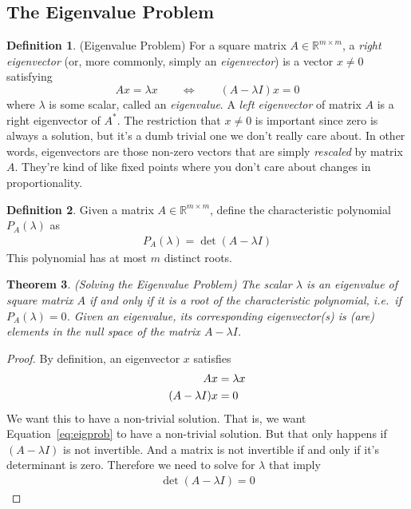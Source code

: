 \documentclass[12pt]{article}
\numberwithin{equation}{section} %
\theoremstyle{plain}
\newtheorem{thm}{Theorem}[section]
\theoremstyle{definition}
\newtheorem{defn}[thm]{Definition}
\theoremstyle{remark}
\newcommand{\Rmm}{\mathbb{R}^{m\times m}}
\begin{document}
\clearpage
\subsection{The Eigenvalue Problem}


\begin{defn}{(Eigenvalue Problem)}
For a square matrix $A \in \Rmm$, a \emph{right eigenvector}
(or, more commonly, simply an \emph{eigenvector}) is a vector $x\neq 0$
satisfying
\begin{equation}
  Ax = \lambda x
  \qquad \Leftrightarrow \qquad
  (A-\lambda I) x = 0
\end{equation}
where $\lambda$ is some scalar, called an \emph{eigenvalue}.  A
\emph{left eigenvector} of matrix $A$ is a right eigenvector of $A^*$.
The restriction that $x\neq 0$ is important since zero is always a
solution, but it's a dumb trivial one we don't really care about.  In
other words, eigenvectors are those non-zero vectors that are simply
\emph{rescaled} by matrix $A$. They're kind of like fixed points where
you don't care about changes in proportionality.
\end{defn}

\begin{defn}
Given a matrix $A\in \Rmm$, define the characteristic
polynomial $P_A(\lambda)$ as
\begin{align}
  \label{chareqn}
  P_A(\lambda) = \det(A-\lambda I)
\end{align}
This polynomial has at most $m$ distinct roots.
\end{defn}

\begin{thm}\emph{(Solving the Eigenvalue Problem)}
The scalar $\lambda$ is an eigenvalue of square matrix $A$ if and only
if it is a root of the characteristic polynomial, i.e.\ if
$P_A(\lambda)=0$.  Given an eigenvalue, its corresponding eigenvector(s)
is (are) elements in the null space of the matrix $A-\lambda I$.
\end{thm}
\begin{proof}
By definition, an eigenvector $x$ satisfies
\begin{align}
  A x &= \lambda x\notag\\
  (A- \lambda I)x &= 0
  \label{eq:eigprob}
\end{align}
We want this to have a non-trivial solution. That is, we want
Equation~\ref{eq:eigprob} to have a non-trivial solution. But that only
happens if $(A-\lambda I)$ is not invertible. And a matrix is not
invertible if and only if it's determinant is zero. Therefore we need to
solve for $\lambda$ that imply
\begin{align*}
  \det(A-\lambda I)=0
\end{align*}
\end{proof}
\end{document}
